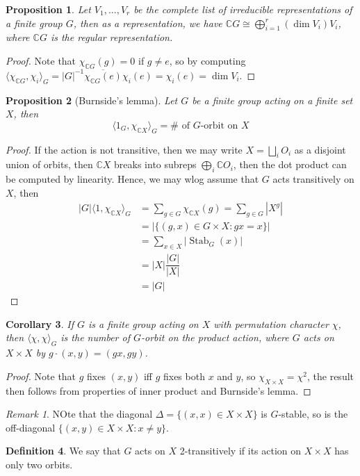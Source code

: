 \documentclass{article}
\theoremstyle{definition}
\newtheorem{defn}{Definition}[section]
\theoremstyle{remark}
\newtheorem{rem}{Remark}
\theoremstyle{plain}
\newtheorem{prop}[defn]{Proposition}
\newtheorem{crly}[defn]{Corollary}
\newcommand{\CC}{\mathbb{C}}
\begin{document}
\begin{prop}
    Let $V_1,...,V_r$ be the complete list of irreducible representations of a finite group $G$, then as a representation, we have $\CC G\cong\bigoplus_{i=1}^r(\dim V_i)V_i$, where $\CC G$ is the regular representation.
\end{prop}
\begin{proof}
    Note that $\chi_{\CC G}(g)=0$ if $g\neq e$, so by computing $\langle\chi_{\CC G},\chi_i\rangle_G=|G|^{-1}\overline{\chi_{\CC G}(e)}\chi_i(e)=\chi_i(e)=\dim V_i$.
\end{proof}
\begin{prop}[Burnside's lemma]
    Let $G$ be a finite group acting on a finite set $X$, then $$\langle 1_G,\chi_{\CC X}\rangle_G=\#\text{ of $G$-orbit on $X$}$$
\end{prop}
\begin{proof}
    If the action is not transitive, then we may write $X=\bigsqcup_iO_i$ as a disjoint union of orbits, then $\CC X$ breaks into subreps $\bigoplus_i \CC O_i$, then the dot product can be computed by linearity. Hence, we may wlog assume that $G$ acts transitively on $X$, then
    \begin{align*}
        |G|\langle1,\chi_{\CC X}\rangle_G&=\sum_{g\in G}\chi_{\CC X}(g)=\sum_{g\in G}|X^g|\\
        &=|\{(g,x)\in G\times X:gx=x\}|\\
        &=\sum_{x\in X}|\operatorname{Stab}_G(x)|\\
        &=|X|\dfrac{|G|}{|X|}\\
        &=|G|
    \end{align*}
\end{proof}

\begin{crly}
    If $G$ is a finite group acting on $X$ with permutation character $\chi$, then $\langle\chi,\chi\rangle_G$ is the number of $G$-orbit on the product action, where $G$ acts on $X\times X$ by $g\cdot (x,y)=(gx,gy)$.
\end{crly}
\begin{proof}
    Note that $g$ fixes $(x,y)$ iff $g$ fixes both $x$ and $y$, so $\chi_{X\times X}=\chi^2$, the result then follows from properties of inner product and Burnside's lemma.
\end{proof}
\begin{rem}
    NOte that the diagonal $\Delta=\{(x,x)\in X\times X\}$ is $G$-stable, so is the off-diagonal $\{(x,y)\in X\times X:x\neq y\}$.
\end{rem}
\begin{defn}
    We say that $G$ acts on $X$ 2-transitively if its action on $X\times X$ has only two orbits. 
\end{defn}
\end{document}
